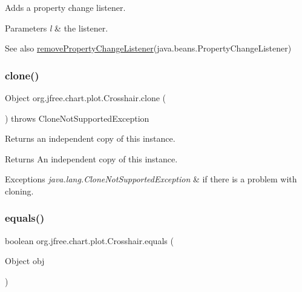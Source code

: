 Adds a property change listener.


\begin{DoxyParams}{Parameters}
{\em l} & the listener.\\
\hline
\end{DoxyParams}
\begin{DoxySeeAlso}{See also}
\mbox{\hyperlink{classorg_1_1jfree_1_1chart_1_1plot_1_1_crosshair_a39d614618c369d9bb3aaec76a4b34a91}{remove\+Property\+Change\+Listener}}(java.\+beans.\+Property\+Change\+Listener) 
\end{DoxySeeAlso}
\mbox{\label{classorg_1_1jfree_1_1chart_1_1plot_1_1_crosshair_ad4d10ed5d5c50f7a08b1a1a5bdaaadb3}} 
\subsubsection{\texorpdfstring{clone()}{clone()}}
{\footnotesize\ttfamily Object org.\+jfree.\+chart.\+plot.\+Crosshair.\+clone (\begin{DoxyParamCaption}{ }\end{DoxyParamCaption}) throws Clone\+Not\+Supported\+Exception}

Returns an independent copy of this instance.

\begin{DoxyReturn}{Returns}
An independent copy of this instance.
\end{DoxyReturn}

\begin{DoxyExceptions}{Exceptions}
{\em java.\+lang.\+Clone\+Not\+Supported\+Exception} & if there is a problem with cloning. \\
\hline
\end{DoxyExceptions}
\mbox{\label{classorg_1_1jfree_1_1chart_1_1plot_1_1_crosshair_a1f4f7829c7c0d0ad3aeb434ffc362788}} 
\subsubsection{\texorpdfstring{equals()}{equals()}}
{\footnotesize\ttfamily boolean org.\+jfree.\+chart.\+plot.\+Crosshair.\+equals (\begin{DoxyParamCaption}\item[{Object}]{obj }\end{DoxyParamCaption})}

